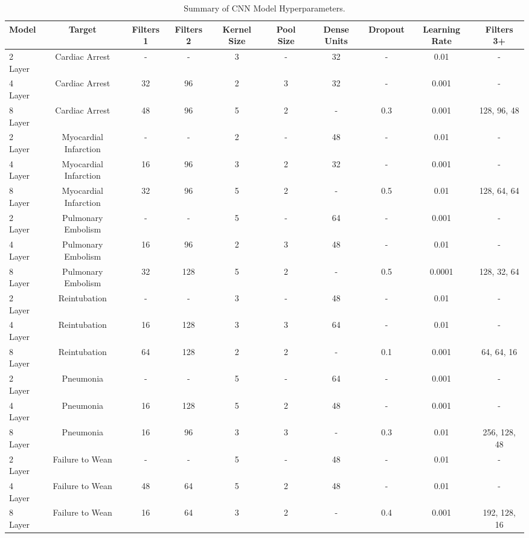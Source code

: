 \documentclass[bst/sn-nature]{sn-jnl}
\begin{document}
\begin{multicols}{2}
\begin{table}[htbp]
    \centering
    \small %
    \setlength{\tabcolsep}{2pt}
    \begin{tabular}{|l|c|c|c|c|c|c|c|c|c|}
    \hline
    \textbf{Model} & \textbf{Target} & \textbf{Filters 1} & \textbf{Filters 2} & \textbf{Kernel Size} & \textbf{Pool Size} & \textbf{Dense Units} & \textbf{Dropout} & \textbf{Learning Rate} & \textbf{Filters 3+} \\
    \hline
    \rowcolor[gray]{0.9} 2 Layer & Cardiac Arrest & - & - & 3 & - & 32 & - & 0.01 & - \\
    4 Layer & Cardiac Arrest & 32 & 96 & 2 & 3 & 32 & - & 0.001 & - \\
    \rowcolor[gray]{0.9} 8 Layer & Cardiac Arrest & 48 & 96 & 5 & 2 & - & 0.3 & 0.001 & 128, 96, 48 \\
    2 Layer & Myocardial Infarction & - & - & 2 & - & 48 & - & 0.01 & - \\
    \rowcolor[gray]{0.9} 4 Layer & Myocardial Infarction & 16 & 96 & 3 & 2 & 32 & - & 0.001 & - \\
    8 Layer & Myocardial Infarction & 32 & 96 & 5 & 2 & - & 0.5 & 0.01 & 128, 64, 64 \\
    \rowcolor[gray]{0.9} 2 Layer & Pulmonary Embolism & - & - & 5 & - & 64 & - & 0.001 & - \\
    4 Layer & Pulmonary Embolism & 16 & 96 & 2 & 3 & 48 & - & 0.01 & - \\
    \rowcolor[gray]{0.9} 8 Layer & Pulmonary Embolism & 32 & 128 & 5 & 2 & - & 0.5 & 0.0001 & 128, 32, 64 \\
    2 Layer & Reintubation & - & - & 3 & - & 48 & - & 0.01 & - \\
    \rowcolor[gray]{0.9} 4 Layer & Reintubation & 16 & 128 & 3 & 3 & 64 & - & 0.01 & - \\
    8 Layer & Reintubation & 64 & 128 & 2 & 2 & - & 0.1 & 0.001 & 64, 64, 16 \\
    \rowcolor[gray]{0.9} 2 Layer & Pneumonia & - & - & 5 & - & 64 & - & 0.001 & - \\
    4 Layer & Pneumonia & 16 & 128 & 5 & 2 & 48 & - & 0.001 & - \\
    \rowcolor[gray]{0.9} 8 Layer & Pneumonia & 16 & 96 & 3 & 3 & - & 0.3 & 0.01 & 256, 128, 48 \\
    2 Layer & Failure to Wean & - & - & 5 & - & 48 & - & 0.01 & - \\
    \rowcolor[gray]{0.9} 4 Layer & Failure to Wean & 48 & 64 & 5 & 2 & 48 & - & 0.01 & - \\
    8 Layer & Failure to Wean & 16 & 64 & 3 & 2 & - & 0.4 & 0.001 & 192, 128, 16 \\
    \hline
    \end{tabular}
    \caption{Summary of CNN Model Hyperparameters.}
    \label{tab:cnn_hyperparams}
\end{table}




\end{multicols}
\end{document}
